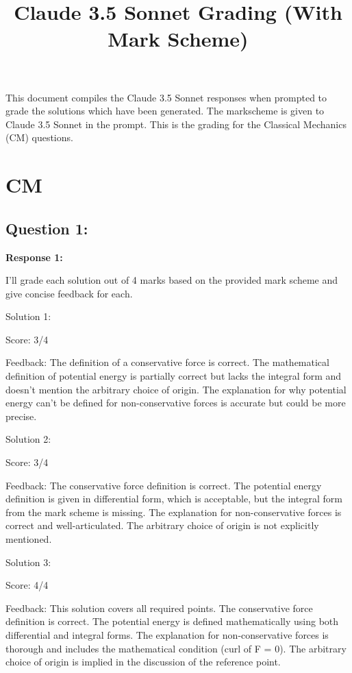 \documentclass[a4paper,11pt]{article}
\begin{document}
\title{Claude 3.5 Sonnet Grading (With Mark Scheme)}

\maketitle

This document compiles the Claude 3.5 Sonnet responses when prompted to grade the solutions which have been generated. The markscheme is given to Claude 3.5 Sonnet in the prompt. This is the grading for the Classical Mechanics (CM) questions. 

\section{CM}

\subsection*{Question 1:}

\textbf{Response 1:}

I'll grade each solution out of 4 marks based on the provided mark scheme and give concise feedback for each.

Solution 1:

Score: 3/4

Feedback: The definition of a conservative force is correct. The mathematical definition of potential energy is partially correct but lacks the integral form and doesn't mention the arbitrary choice of origin. The explanation for why potential energy can't be defined for non-conservative forces is accurate but could be more precise.

Solution 2:

Score: 3/4

Feedback: The conservative force definition is correct. The potential energy definition is given in differential form, which is acceptable, but the integral form from the mark scheme is missing. The explanation for non-conservative forces is correct and well-articulated. The arbitrary choice of origin is not explicitly mentioned.

Solution 3:

Score: 4/4

Feedback: This solution covers all required points. The conservative force definition is correct. The potential energy is defined mathematically using both differential and integral forms. The explanation for non-conservative forces is thorough and includes the mathematical condition (curl of F = 0). The arbitrary choice of origin is implied in the discussion of the reference point.
\end{document}
